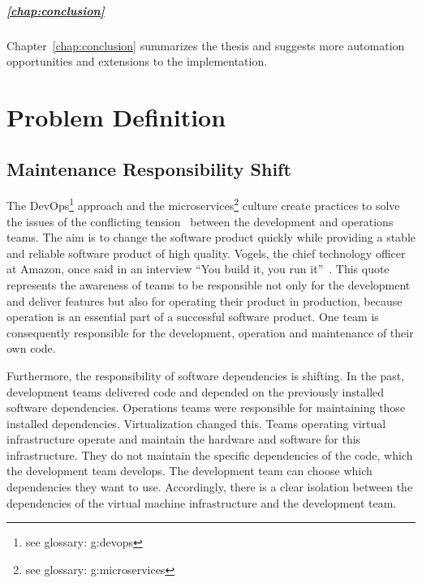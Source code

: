 \paragraph{\ref{chap:conclusion} }
Chapter~\ref{chap:conclusion} summarizes the thesis and suggests more automation
opportunities and extensions to the implementation.

\chapter{Problem Definition}
\label{chap:problem}

\section{Maintenance Responsibility Shift}

The DevOps\footnote{see glossary: \gls{g:devops}} approach and the
microservices\footnote{see glossary: \gls{g:microservices}} culture create practices to
solve the issues of the conflicting tension~\cite{sre_intro} between the development and
operations teams. The aim is to change the software product quickly while
providing a stable and reliable software product of high quality. Vogels,
the chief technology officer at Amazon, once said in an interview “You build it, you run
it”~\cite{build_run}. This quote represents the awareness of teams to be
responsible not only for the development and deliver features but also
for operating their product in production, because operation is an essential
part of a successful software product. One team is consequently responsible for the
development, operation and maintenance of their own code.

Furthermore, the responsibility of software dependencies is shifting. In the past, development
teams delivered code and depended on the previously installed software
dependencies. Operations teams were responsible for maintaining those installed
dependencies. Virtualization changed this. Teams operating virtual infrastructure operate
and maintain the hardware and software for this infrastructure. They do not maintain the
specific dependencies of the code, which the development team develops. The development
team can choose which dependencies they want to use. Accordingly, there is a clear
isolation between the dependencies of the virtual machine infrastructure and the
development team.

